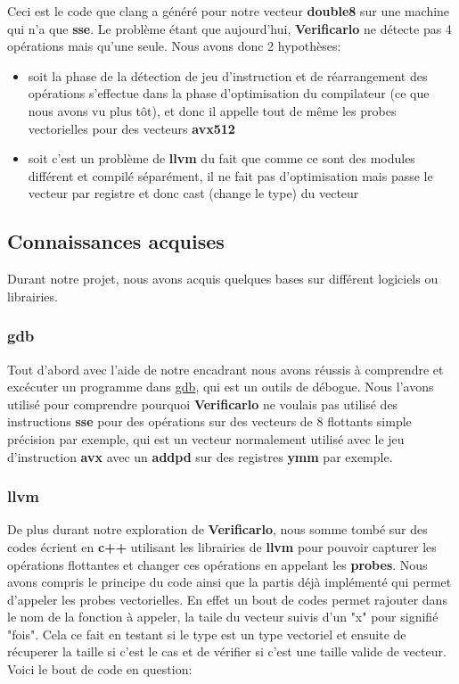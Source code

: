\documentclass[11pt]{article}
\begin{document}
Ceci est le code que clang a généré pour notre vecteur \textbf{double8} sur une
machine qui n'a que \textbf{sse}.
\vspace{5mm}
Le problème étant que aujourd'hui, \textbf{Verificarlo} ne détecte pas 4 opérations
mais qu'une seule.
\vspace{5mm}
Nous avons donc 2 hypothèses:
\begin{itemize}
\item soit la phase de la détection de jeu d'instruction et de réarrangement des
opérations s'effectue dans la phase d'optimisation du compilateur (ce que
nous avons vu plus tôt), et donc il appelle tout de même les probes
vectorielles pour des vecteurs \textbf{avx512}
\item soit c'est un problème de \textbf{llvm} du fait que comme ce sont des modules
différent et compilé séparément, il ne fait pas d'optimisation mais passe
le vecteur par registre et donc cast (change le type) du vecteur
\end{itemize}

\subsection{Connaissances acquises}
\label{sec:org6123cba}

Durant notre projet, nous avons acquis quelques bases sur différent logiciels
ou librairies.

\subsubsection{gdb}
\label{sec:orgb877905}

Tout d'abord avec l'aide de notre encadrant nous avons réussis à comprendre
et excécuter un programme dans \href{https://www.gnu.org/software/gdb/}{gdb}, qui est un outils de débogue. Nous
l'avons utilisé pour comprendre pourquoi \textbf{Verificarlo} ne voulais pas utilisé
des instructions \textbf{sse} pour des opérations sur des vecteurs de 8 flottants
simple précision par exemple, qui est un vecteur normalement utilisé avec le
jeu d'instruction \textbf{avx} avec un \textbf{addpd} sur des registres \textbf{ymm} par exemple.

\subsubsection{llvm}
\label{sec:org475f20d}

De plus durant notre exploration de \textbf{Verificarlo}, nous somme tombé sur des
codes écrient en \textbf{c++} utilisant les librairies de \textbf{llvm} pour pouvoir
capturer les opérations flottantes et changer ces opérations en appelant les
\textbf{probes}.
\vspace{5mm}
Nous avons compris le principe du code ainsi que la partis déjà implémenté
qui permet d'appeler les probes vectorielles. En effet un bout de codes
permet rajouter dans le nom de la fonction à appeler, la taile du vecteur
suivis d'un "x" pour signifié "fois". Cela ce fait en testant si le type est
un type vectoriel et ensuite de récuperer la taille si c'est le cas et de
vérifier si c'est une taille valide de vecteur.
\vspace{5mm}
Voici le bout de code en question:
\end{document}
